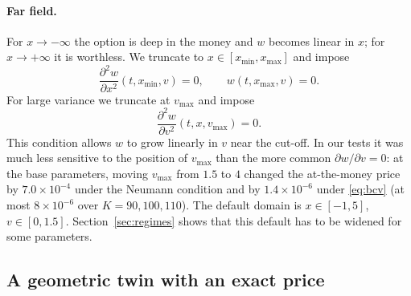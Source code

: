 \paragraph{Far field.} For $x\to-\infty$ the option is deep in the money and $w$ becomes linear in $x$;
for $x\to+\infty$ it is worthless. We truncate to $x\in[x_{\min},x_{\max}]$ and impose
\begin{equation}\label{eq:bcx}
\frac{\partial^2 w}{\partial x^2}(t,x_{\min},v) = 0,\qquad w(t,x_{\max},v) = 0 .
\end{equation}
For large variance we truncate at $v_{\max}$ and impose
\begin{equation}\label{eq:bcv}
\frac{\partial^2 w}{\partial v^2}(t,x,v_{\max}) = 0 .
\end{equation}
This condition allows $w$ to grow linearly in $v$ near the cut-off. In our tests it was much less sensitive
to the position of $v_{\max}$ than the more common $\partial w/\partial v=0$: at the base parameters,
moving $v_{\max}$ from $1.5$ to $4$ changed the at-the-money price by $7.0\times10^{-4}$ under the
Neumann condition and by $1.4\times10^{-6}$ under \eqref{eq:bcv} (at most $8\times10^{-6}$ over
$K=90,100,110$). The default domain is $x\in[-1,5]$,
$v\in[0,1.5]$. Section~\ref{sec:regimes} shows that this default has to be widened for some parameters.

\subsection{A geometric twin with an exact price}\label{sec:twin}

